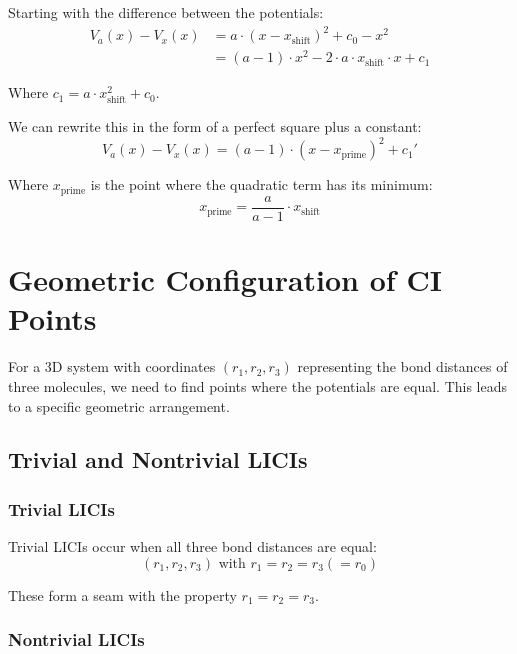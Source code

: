 \documentclass{article}
\begin{document}
Starting with the difference between the potentials:
\begin{align}
V_a(x) - V_x(x) &= a \cdot (x - x_{\text{shift}})^2 + c_0 - x^2 \\
&= (a - 1) \cdot x^2 - 2 \cdot a \cdot x_{\text{shift}} \cdot x + c_1
\end{align}

Where $c_1 = a \cdot x_{\text{shift}}^2 + c_0$.

We can rewrite this in the form of a perfect square plus a constant:
\begin{equation}
V_a(x) - V_x(x) = (a - 1) \cdot (x - x_{\text{prime}})^2 + c_1'
\end{equation}

Where $x_{\text{prime}}$ is the point where the quadratic term has its minimum:
\begin{equation}
x_{\text{prime}} = \frac{a}{a - 1} \cdot x_{\text{shift}}
\end{equation}

\section{Geometric Configuration of CI Points}

For a 3D system with coordinates $(r_1, r_2, r_3)$ representing the bond distances of three molecules, we need to find points where the potentials are equal. This leads to a specific geometric arrangement.

\subsection{Trivial and Nontrivial LICIs}

\subsubsection{Trivial LICIs}

Trivial LICIs occur when all three bond distances are equal:
\begin{equation}
(r_1, r_2, r_3) \text{ with } r_1 = r_2 = r_3 (= r_0)
\end{equation}

These form a seam with the property $r_1 = r_2 = r_3$.

\subsubsection{Nontrivial LICIs}
\end{document}
